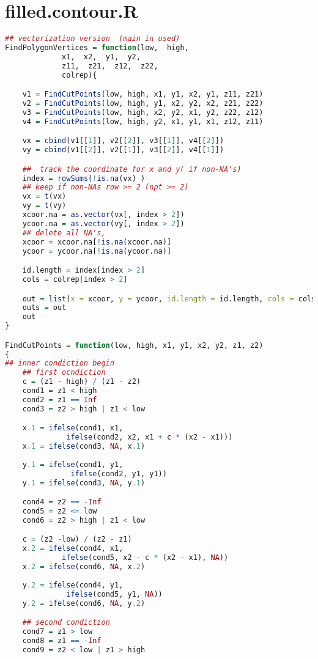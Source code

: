 \section{filled.contour.R}
\begin{lstlisting}[language = R]
## vectorization version  (main in used)
FindPolygonVertices = function(low,  high,
		     x1,  x2,  y1,  y2,
		     z11,  z21,  z12,  z22,
             colrep){

    v1 = FindCutPoints(low, high, x1, y1, x2, y1, z11, z21)
    v2 = FindCutPoints(low, high, y1, x2, y2, x2, z21, z22)
    v3 = FindCutPoints(low, high, x2, y2, x1, y2, z22, z12)
    v4 = FindCutPoints(low, high, y2, x1, y1, x1, z12, z11)

    vx = cbind(v1[[1]], v2[[2]], v3[[1]], v4[[2]])
    vy = cbind(v1[[2]], v2[[1]], v3[[2]], v4[[1]])

    ##  track the coordinate for x and y( if non-NA's)
    index = rowSums(!is.na(vx) )
    ## keep if non-NAs row >= 2 (npt >= 2)
    vx = t(vx)
    vy = t(vy)
    xcoor.na = as.vector(vx[, index > 2])
    ycoor.na = as.vector(vy[, index > 2])
    ## delete all NA's,
    xcoor = xcoor.na[!is.na(xcoor.na)]
    ycoor = ycoor.na[!is.na(ycoor.na)]

    id.length = index[index > 2]
    cols = colrep[index > 2]

    out = list(x = xcoor, y = ycoor, id.length = id.length, cols = cols)
    outs = out
    out
}

FindCutPoints = function(low, high, x1, y1, x2, y2, z1, z2)
{
## inner condiction begin
    ## first ocndiction
    c = (z1 - high) / (z1 - z2)
    cond1 = z1 < high
    cond2 = z1 == Inf
    cond3 = z2 > high | z1 < low

    x.1 = ifelse(cond1, x1, 
              ifelse(cond2, x2, x1 + c * (x2 - x1)))
    x.1 = ifelse(cond3, NA, x.1)
                
    y.1 = ifelse(cond1, y1, 
               ifelse(cond2, y1, y1))
    y.1 = ifelse(cond3, NA, y.1)

    cond4 = z2 == -Inf
    cond5 = z2 <= low
    cond6 = z2 > high | z1 < low

    c = (z2 -low) / (z2 - z1)
    x.2 = ifelse(cond4, x1,
             ifelse(cond5, x2 - c * (x2 - x1), NA))
    x.2 = ifelse(cond6, NA, x.2)
             
    y.2 = ifelse(cond4, y1,
              ifelse(cond5, y1, NA))
    y.2 = ifelse(cond6, NA, y.2)

    ## second condiction
    cond7 = z1 > low
    cond8 = z1 == -Inf
    cond9 = z2 < low | z1 > high


\end{lstlisting}

